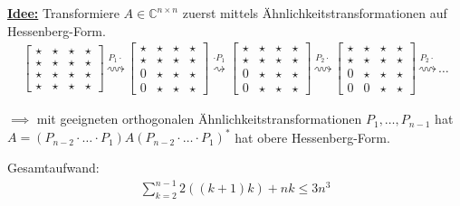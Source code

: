 \documentclass{book}
\def\C{\mathbb{C}}
\begin{document}
            \underline{\textbf{Idee:}} Transformiere $A\in\C^{n\times n}$ zuerst mittels Ähnlichkeitstransformationen auf
            Hessenberg-Form.
            \begin{align*}
                \begin{bmatrix}
                    \star & \star & \star & \star \\
                    \star & \star & \star & \star \\
                    \star & \star & \star & \star \\
                    \star & \star & \star & \star 
                \end{bmatrix}
                \stackrel{P_1\cdot}{\rightsquigarrow} \begin{bmatrix}
                    \star & \star & \star & \star \\
                    \star & \star & \star & \star \\
                    0 & \star & \star & \star \\
                    0 & \star & \star & \star 
                \end{bmatrix}
                \stackrel{\cdot P_1}{\rightsquigarrow} \begin{bmatrix}
                    \star & \star & \star & \star \\
                    \star & \star & \star & \star \\
                    0 & \star & \star & \star \\
                    0 & \star & \star & \star 
                \end{bmatrix}
                \stackrel{P_2\cdot}{\rightsquigarrow}\begin{bmatrix}
                    \star & \star & \star & \star \\
                    \star & \star & \star & \star \\
                    0 & \star & \star & \star \\
                    0 & 0 & \star & \star 
                \end{bmatrix}\stackrel{P_2\cdot }{\rightsquigarrow} \dots
            \end{align*}

            $\implies $ mit geeigneten orthogonalen Ähnlichkeitstransformationen  $P_1,\dots,P_{n-1}$ hat $A=(P_{n-2}\cdot\dots\cdot P_1)A (P_{n-2}\cdot\dots\cdot P_1)^*$
            hat obere Hessenberg-Form.

            Gesamtaufwand: 
            \begin{align*}
                \sum_{k=2}^{n-1} 2((k+1)k)+nk\leq 3n^3
            \end{align*}
\end{document}
